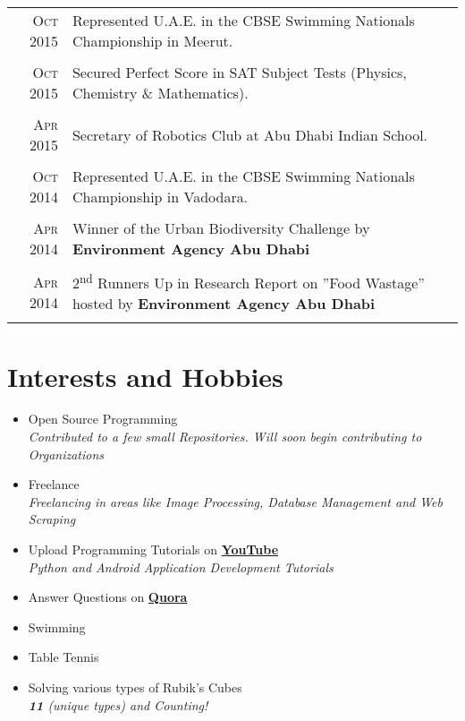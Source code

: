 \documentclass[a4paper,10pt]{article}
\begin{document}
\begin{tabular}{r|p{13.7cm}}
\textsc{Oct} 2015 & Represented U.A.E. in the CBSE Swimming Nationals Championship in Meerut.\\\multicolumn{2}{c}{}\\
\textsc{Oct} 2015 & Secured Perfect Score in SAT Subject Tests (Physics, Chemistry \& Mathematics).\\\multicolumn{2}{c}{}\\
\textsc{Apr} 2015 & Secretary of Robotics Club at Abu Dhabi Indian School. \\\multicolumn{2}{c}{}\\
\textsc{Oct} 2014 & Represented U.A.E. in the CBSE Swimming Nationals Championship in Vadodara.  \\\multicolumn{2}{c}{}\\
\textsc{Apr} 2014 & Winner of the Urban Biodiversity Challenge by \textbf{Environment Agency Abu Dhabi} \\\multicolumn{2}{c}{}\\
\textsc{Apr} 2014 & 2\textsuperscript{nd} Runners Up in Research Report on ''Food Wastage'' hosted by \textbf{Environment Agency Abu Dhabi} \\\multicolumn{2}{c}{}\\
\end{tabular}




\section{Interests and Hobbies}
\begin{itemize}
  \item Open Source Programming \\
  \emph{\small{Contributed to a few small Repositories. Will soon begin contributing to Organizations}}
  \item Freelance \\
  \emph{\small{Freelancing in areas like Image Processing, Database Management and Web Scraping}}
  \item Upload Programming Tutorials on \href{https://www.youtube.com/channel/UC5A8roRFNDmhw4jNKiQqWnQ}{\textbf{YouTube}} \\
  \emph{\small{Python and Android Application Development Tutorials}}
  \item Answer Questions on \href{https://www.quora.com/profile/Yashit-Maheshwary}{\textbf{Quora}}
  \item Swimming
  \item Table Tennis
  \item Solving various types of Rubik's Cubes \\
  \emph{\normalsize{\textbf{11}} \small{(unique types) and Counting!}}
\end{itemize}
\end{document}
